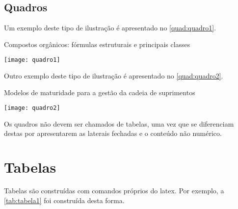 \subsection{Quadros}\label{sec:quadros}

Um exemplo deste tipo de ilustração é apresentado no \autoref{quad:quadro1}.

\begin{tabframed}[htb]%
\caption{Compostos orgânicos: fórmulas estruturais e principais classes}%
\label{quad:quadro1}%
\texttt{[image: quadro1]}%
\end{tabframed}

Outro exemplo deste tipo de ilustração é apresentado no \autoref{quad:quadro2}.

\begin{tabframed}[htb]%
\caption{Modelos de maturidade para a gestão da cadeia de suprimentos}%
\label{quad:quadro2}%
\texttt{[image: quadro2]}%
\end{tabframed}

Os quadros não devem ser chamados de tabelas, uma vez que se diferenciam destas por apresentarem as laterais fechadas e o conteúdo não numérico.

\section{Tabelas}\label{sec:tabelas}

Tabelas são construídas com comandos próprios do \gls{latex}. Por exemplo, a \autoref{tab:tabela1} foi construída desta forma.

